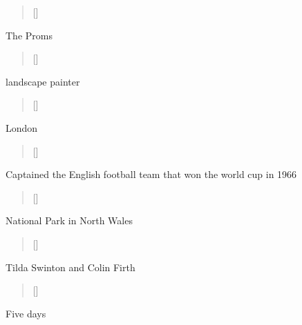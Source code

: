 \documentclass[grid,avery5371]{flashcards}
\begin{document}
\begin{flashcard}[]{%
\begin{verse}[\versewidth]
\end{verse}}

The Proms

\end{flashcard}


\begin{flashcard}[]{%
\begin{verse}[\versewidth]
\end{verse}}

landscape painter

\end{flashcard}

\begin{flashcard}[]{%
\begin{verse}[\versewidth]
\end{verse}}

London 

\end{flashcard}

\begin{flashcard}[]{%
\begin{verse}[\versewidth]
\end{verse}}

Captained the English football team that won the world cup in 1966 

\end{flashcard}

\begin{flashcard}[]{%
\begin{verse}[\versewidth]
\end{verse}}

National Park in North Wales

\end{flashcard}

\begin{flashcard}[]{%
\begin{verse}[\versewidth]
\end{verse}}

Tilda Swinton and Colin Firth

\end{flashcard}

\begin{flashcard}[]{%
\begin{verse}[\versewidth]
\end{verse}}

Five days

\end{flashcard}
\end{document}
